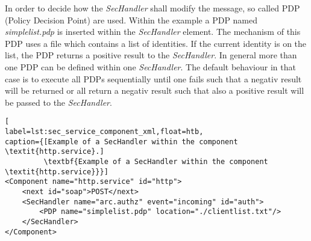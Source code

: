 In order to decide how the \textit{SecHandler} shall modify the message, so called PDP (Policy Decision Point) are used. Within the example a PDP named \textit{simplelist.pdp} is inserted within the \textit{SecHandler} element. The mechanism of this PDP uses a file which contains a list of identities. If the current identity is on the list, the PDP returns a positive result to the \textit{SecHandler}. In general more than one PDP can be defined within one \textit{SecHandler}. The default behaviour in that case is to execute all PDPs sequentially until one fails such that a negativ result will be returned or all return a negativ result such that also a positive result will be passed to the \textit{SecHandler}.\\
%
%
%
\begin{lstlisting}[
label=lst:sec_service_component_xml,float=htb,
caption={[Example of a SecHandler within the component \textit{http.service}.]
         \textbf{Example of a SecHandler within the component \textit{http.service}}}]
<Component name="http.service" id="http">
	<next id="soap">POST</next>
	<SecHandler name="arc.authz" event="incoming" id="auth">
		<PDP name="simplelist.pdp" location="./clientlist.txt"/>
	</SecHandler>
</Component>
\end{lstlisting}





